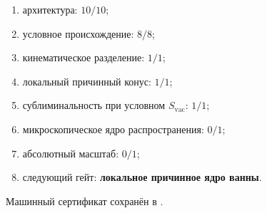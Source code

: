\begin{protocol}\begin{enumerate}
\item архитектура: \textbf{$10/10$};
\item условное происхождение: \textbf{$8/8$};
\item кинематическое разделение: \textbf{$1/1$};
\item локальный причинный конус: \textbf{$1/1$};
\item сублиминальность при условном $S_{\mathrm{vac}}$: \textbf{$1/1$};
\item микроскопическое ядро распространения: \textbf{$0/1$};
\item абсолютный масштаб: \textbf{$0/1$};
\item следующий гейт: \textbf{локальное причинное ядро ванны}.
\end{enumerate}\end{protocol}

Машинный сертификат сохранён в
.